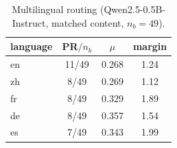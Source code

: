 \documentclass[sigconf,nonacm]{acmart}
\theoremstyle{definition}
\newcommand{\nb}{n_b}
\begin{document}
\begin{table}[h]
\caption{Multilingual routing (Qwen2.5-0.5B-Instruct, matched content, $\nb=49$).}
\label{tab:lang}
\small
\begin{tabular}{lccc}
\toprule
language & PR$/\nb$ & $\mu$ & margin \\
\midrule
en & 11/49 & 0.268 & 1.24 \\
zh & 8/49  & 0.269 & 1.12 \\
fr & 8/49  & 0.329 & 1.89 \\
de & 8/49  & 0.357 & 1.54 \\
es & 7/49  & 0.343 & 1.99 \\
\bottomrule
\end{tabular}
\end{table}
\end{document}
